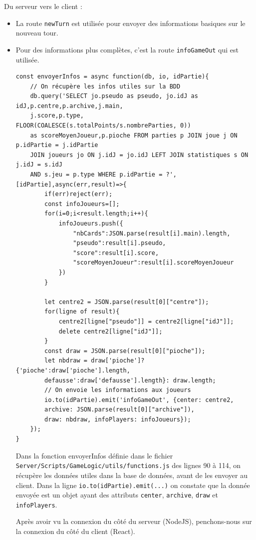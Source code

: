 \documentclass[a4paper]{article}
\begin{document}
Du serveur vers le client :
\begin{itemize}
    \item La route \texttt{newTurn} est utilisée pour envoyer des informations basiques sur le nouveau tour.
    \item Pour des informations plus complètes, c'est la route \texttt{infoGameOut} qui est utilisée.

\begin{verbatim}
const envoyerInfos = async function(db, io, idPartie){
    // On récupère les infos utiles sur la BDD
    db.query('SELECT jo.pseudo as pseudo, jo.idJ as idJ,p.centre,p.archive,j.main,
    j.score,p.type,    FLOOR(COALESCE(s.totalPoints/s.nombreParties, 0))
    as scoreMoyenJoueur,p.pioche FROM parties p JOIN joue j ON p.idPartie = j.idPartie
    JOIN joueurs jo ON j.idJ = jo.idJ LEFT JOIN statistiques s ON j.idJ = s.idJ 
    AND s.jeu = p.type WHERE p.idPartie = ?',[idPartie],async(err,result)=>{
        if(err)reject(err);
        const infoJoueurs=[];
        for(i=0;i<result.length;i++){
            infoJoueurs.push({
                "nbCards":JSON.parse(result[i].main).length,
                "pseudo":result[i].pseudo,
                "score":result[i].score,
                "scoreMoyenJoueur":result[i].scoreMoyenJoueur
            })
        }

        let centre2 = JSON.parse(result[0]["centre"]);
        for(ligne of result){
            centre2[ligne["pseudo"]] = centre2[ligne["idJ"]];
            delete centre2[ligne["idJ"]];
        }
        const draw = JSON.parse(result[0]["pioche"]);
        let nbdraw = draw['pioche']? {'pioche':draw['pioche'].length,
        defausse':draw['defausse'].length}: draw.length;
        // On envoie les informations aux joueurs
        io.to(idPartie).emit('infoGameOut', {center: centre2, 
        archive: JSON.parse(result[0]["archive"]), 
        draw: nbdraw, infoPlayers: infoJoueurs});
    });
}
\end{verbatim}
Dans la fonction envoyerInfos définie dans le fichier \texttt{Server/Scripts/GameLogic/utils/functions.js} des lignes 90 à 114, on récupère les données utiles dans la base de données, avant de les envoyer au client. Dans la ligne \texttt{io.to(idPartie).emit(...)} on constate que la donnée envoyée est un objet ayant des attributs \texttt{center}, \texttt{archive}, \texttt{draw} et \texttt{infoPlayers}.

Après avoir vu la connexion du côté du serveur (NodeJS), penchons-nous sur la connexion du côté du client (React).


\end{itemize}
\end{document}
